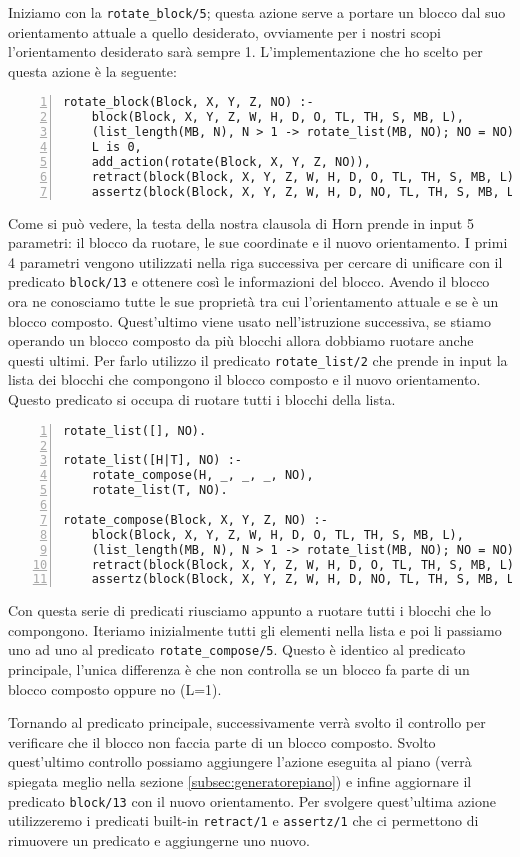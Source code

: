 Iniziamo con la \verb+rotate_block/5+; questa azione serve a portare un blocco dal suo orientamento attuale a quello desiderato, ovviamente per i nostri scopi l'orientamento desiderato sarà sempre 1.
L'implementazione che ho scelto per questa azione è la seguente:
\begin{lstlisting}[numbers=left]
rotate_block(Block, X, Y, Z, NO) :-
    block(Block, X, Y, Z, W, H, D, O, TL, TH, S, MB, L),
    (list_length(MB, N), N > 1 -> rotate_list(MB, NO); NO = NO),
    L is 0,
    add_action(rotate(Block, X, Y, Z, NO)),
    retract(block(Block, X, Y, Z, W, H, D, O, TL, TH, S, MB, L)),
    assertz(block(Block, X, Y, Z, W, H, D, NO, TL, TH, S, MB, L)).
\end{lstlisting}
Come si può vedere, la testa della nostra clausola di Horn prende in input 5 parametri: il blocco da ruotare, le sue coordinate e il nuovo orientamento. I primi 4 parametri vengono utilizzati nella riga successiva per cercare di unificare con il predicato \verb+block/13+ e ottenere così le informazioni del blocco.
Avendo il blocco ora ne conosciamo tutte le sue proprietà tra cui l'orientamento attuale e se è un blocco composto. Quest'ultimo viene usato nell'istruzione successiva, se stiamo operando un blocco composto da più blocchi allora dobbiamo ruotare anche questi ultimi. Per farlo utilizzo il predicato \verb+rotate_list/2+ che prende in input la lista dei blocchi che compongono il blocco composto e il nuovo orientamento. Questo predicato si occupa di ruotare tutti i blocchi della lista.
\begin{lstlisting}[numbers=left]
rotate_list([], NO).

rotate_list([H|T], NO) :-
    rotate_compose(H, _, _, _, NO),
    rotate_list(T, NO).

rotate_compose(Block, X, Y, Z, NO) :-
    block(Block, X, Y, Z, W, H, D, O, TL, TH, S, MB, L),
    (list_length(MB, N), N > 1 -> rotate_list(MB, NO); NO = NO),
    retract(block(Block, X, Y, Z, W, H, D, O, TL, TH, S, MB, L)),
    assertz(block(Block, X, Y, Z, W, H, D, NO, TL, TH, S, MB, L)).
\end{lstlisting}
Con questa serie di predicati riusciamo appunto a ruotare tutti i blocchi che lo compongono. Iteriamo inizialmente tutti gli elementi nella lista e poi li passiamo uno ad uno al predicato \verb+rotate_compose/5+. Questo è identico al predicato principale, l'unica differenza è che non controlla se un blocco fa parte di un blocco composto oppure no (L=1).

Tornando al predicato principale, successivamente verrà svolto il controllo per verificare che il blocco non faccia parte di un blocco composto. Svolto quest'ultimo controllo possiamo aggiungere l'azione eseguita al piano (verrà spiegata meglio nella sezione \ref{subsec:generatorepiano}) e infine aggiornare il predicato \verb+block/13+ con il nuovo orientamento.
Per svolgere quest'ultima azione utilizzeremo i predicati built-in \verb+retract/1+ e \verb+assertz/1+ che ci permettono di rimuovere un predicato e aggiungerne uno nuovo.

